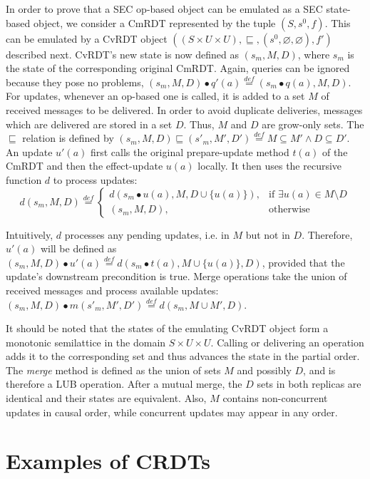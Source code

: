 In order to prove that a SEC op-based object can be emulated as a SEC
state-based object, we consider a CmRDT represented by the tuple $(S, s^{0},
f)$. This can be emulated by a CvRDT object $((S \times U \times U),
\sqsubseteq, (s^{0}, \varnothing, \varnothing), f')$ described next. CvRDT's new
state is now defined as $(s_{m},M,D)$, where $s_{m}$ is the state of the
corresponding original CmRDT. Again, queries can be ignored because they pose no
problems, $(s_{m},M,D) \bullet q'(a) \stackrel{def}{=} (s_{m} \bullet
q(a),M,D)$. For updates, whenever an op-based one is called, it is added to a
set $M$ of received messages to be delivered. In order to avoid duplicate
deliveries, messages which are delivered are stored in a set $D$. Thus, $M$ and
$D$ are grow-only sets. The $\sqsubseteq$ relation is defined by $(s_{m},M,D)
\sqsubseteq (s'_{m},M',D') \stackrel{def}{=} M \subseteq M' \land D \subseteq
D'$. An update $u'(a)$ first calls the original prepare-update method $t(a)$ of
the CmRDT and then the effect-update $u(a)$ locally. It then uses the recursive
function $d$ to process updates:
\[
d(s_{m},M,D) \stackrel{def}{=} 
\begin{cases}
d(s_{m} \bullet u(a),M,D \cup \{u(a)\}), & \text{if }\exists u(a) \in M
\setminus D \\
 (s_{m},M,D), & \text{otherwise}
\end{cases}
\]

Intuitively, $d$ processes any pending updates, i.e. in $M$ but not in $D$.
Therefore, $u'(a)$ will be defined as $(s_{m},M,D) \bullet u'(a)
\stackrel{def}{=} d(s_{m} \bullet t(a),M \cup \{u(a)\},D)$, provided that the
update's downstream precondition is true. Merge operations take the union of
received messages and process available updates: $(s_{m},M,D) \bullet
m(s'_{m},M',D') \stackrel{def}{=} d(s_{m},M \cup M',D)$.

It should be noted that the states of the emulating CvRDT object form a
monotonic semilattice in the domain $S \times U \times U$. Calling or delivering
an operation adds it to the corresponding set and thus advances the state in the
partial order. The \textit{merge} method is defined as the union of sets $M$ and
possibly $D$, and is therefore a LUB operation. After a mutual merge, the $D$
sets in both replicas are identical and their states are equivalent. Also, $M$
contains non-concurrent updates in causal order, while concurrent updates may
appear in any order.

\section{Examples of CRDTs}
\label{sec:examples_of_crdts}

